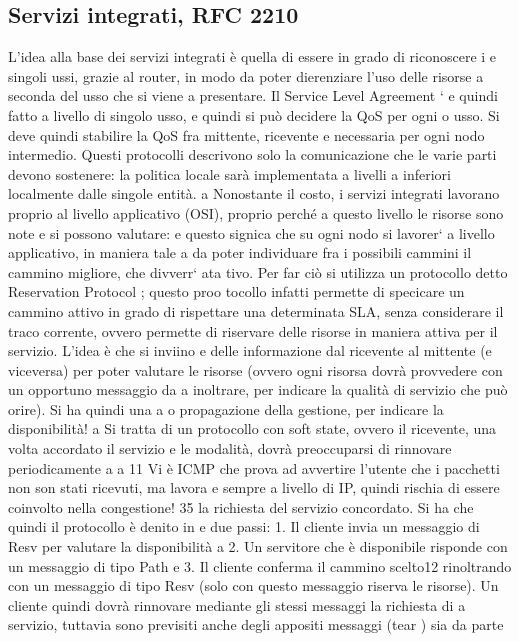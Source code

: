 \subsection{Servizi integrati, RFC 2210}
L'idea alla base dei servizi integrati è quella di essere in grado di riconoscere i
e
singoli ussi, grazie al router, in modo da poter dierenziare l'uso delle risorse
a seconda del usso che si viene a presentare. Il Service Level Agreement `
e
quindi fatto a livello di singolo usso, e quindi si può decidere la QoS per ogni
o
usso. Si deve quindi stabilire la QoS fra mittente, ricevente e necessaria per
ogni nodo intermedio. Questi protocolli descrivono solo la comunicazione che
le varie parti devono sostenere: la politica locale sarà implementata a livelli
a
inferiori localmente dalle singole entità.
a
Nonostante il costo, i servizi integrati lavorano proprio al livello applicativo
(OSI), proprio perché a questo livello le risorse sono note e si possono valutare:
e
questo signica che su ogni nodo si lavorer` a livello applicativo, in maniera tale
a
da poter individuare fra i possibili cammini il cammino migliore, che divverr` ata
tivo. Per far ciò si utilizza un protocollo detto Reservation Protocol ; questo proo
tocollo infatti permette di specicare un cammino attivo in grado di rispettare
una determinata SLA, senza considerare il traco corrente, ovvero permette di
riservare delle risorse in maniera attiva per il servizio. L'idea è che si inviino
e
delle informazione dal ricevente al mittente (e viceversa) per poter valutare le
risorse (ovvero ogni risorsa dovrà provvedere con un opportuno messaggio da
a
inoltrare, per indicare la qualità di servizio che può orire). Si ha quindi una
a
o
propagazione della gestione, per indicare la disponibilità!
a
Si tratta di un protocollo con soft state, ovvero il ricevente, una volta accordato il servizio e le modalità, dovrà
preoccuparsi di rinnovare periodicamente
a
a
11 Vi è ICMP che prova ad avvertire l'utente che i pacchetti non son stati ricevuti, ma lavora
e
sempre a livello di IP, quindi rischia di essere coinvolto nella congestione!
35
la richiesta del servizio concordato. Si ha che quindi il protocollo è denito in
e
due passi:
1. Il cliente invia un messaggio di Resv per valutare la disponibilità
a
2. Un servitore che è disponibile risponde con un messaggio di tipo Path
e
3. Il cliente conferma il cammino scelto12 rinoltrando con un messaggio di
tipo Resv (solo con questo messaggio riserva le risorse).
Un cliente quindi dovrà rinnovare mediante gli stessi messaggi la richiesta di
a
servizio, tuttavia sono previsiti anche degli appositi messaggi (tear ) sia da parte
